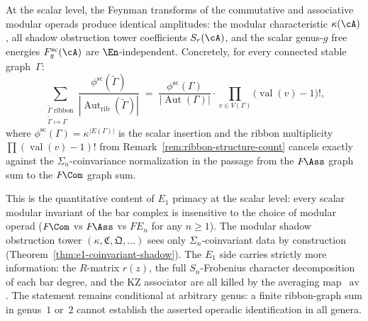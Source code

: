 \begin{remark}[$F\!\Com = F\!\Ass$ at the scalar level]
\label{rem:fcom-fass-scalar-agreement}
\ClaimStatusConditional
{}
At the scalar level, the Feynman transforms of the commutative and
associative modular operads produce identical amplitudes: the
modular characteristic $\kappa(\cA)$, all shadow obstruction tower
coefficients $S_r(\cA)$, and the scalar genus-$g$ free energies
$F_g^{\mathrm{sc}}(\cA)$
are $\En$-independent. Concretely, for every connected stable
graph~$\Gamma$:
\begin{equation}
\label{eq:fcom-fass-scalar}
\sum_{\substack{\widetilde\Gamma\;\text{ribbon} \\
 \widetilde\Gamma \mapsto \Gamma}}
\frac{\phi^{\mathrm{sc}}(\widetilde\Gamma)}
 {|\operatorname{Aut}_{\mathrm{rib}}(\widetilde\Gamma)|}
\;=\;
\frac{\phi^{\mathrm{sc}}(\Gamma)}{|\operatorname{Aut}(\Gamma)|}
\cdot \prod_{v \in V(\Gamma)}
\bigl(\operatorname{val}(v)-1\bigr)!,
\end{equation}
where $\phi^{\mathrm{sc}}(\Gamma) = \kappa^{|E(\Gamma)|}$ is the
scalar insertion and the ribbon multiplicity
$\prod(\operatorname{val}(v)-1)!$ from
Remark~\ref{rem:ribbon-structure-count} cancels exactly against
the $\Sigma_n$-coinvariance normalization in the passage from the
$F\!\Ass$ graph sum to the $F\!\Com$ graph sum.

This is the quantitative content of $E_1$ primacy at the scalar
level: every scalar modular invariant of the bar complex is
insensitive to the choice of modular operad ($F\!\Com$ vs $F\!\Ass$
vs $F\!E_n$ for any $n \geq 1$). The modular shadow obstruction
tower $(\kappa, \mathfrak{C}, \mathfrak{Q}, \ldots)$ sees only
$\Sigma_n$-coinvariant data by construction
(Theorem~\ref{thm:e1-coinvariant-shadow}). The $E_1$ side carries
strictly more information: the $R$-matrix $r(z)$, the full
$S_n$-Frobenius character decomposition of each bar degree, and the
KZ associator are all killed by the averaging map~$\operatorname{av}$.
The statement remains conditional at arbitrary genus: a finite
ribbon-graph sum in genus~$1$ or~$2$ cannot establish the asserted
operadic identification in all genera.
\end{remark}

